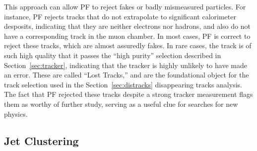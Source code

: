   This approach can allow PF to reject fakes or badly mismeasured particles.
  For instance, PF rejects tracks that do not extrapolate to significant calorimeter desposits, indicating that they are neither electrons nor hadrons, and also do not have a corresponding track in the muon chamber.
  In most cases, PF is correct to reject these tracks, which are almost assuredly fakes.
  In rare cases, the track is of such high quality that it passes the ``high purity'' selection described in Section~\ref{sec:tracker}, indicating that the tracker is highly unlikely to have made an error.
  These are called ``Lost Tracks,'' and are the foundational object for the track selection used in the Section~\ref{sec:distracks} disappearing tracks analysis.
  The fact that PF rejected these tracks despite a strong tracker measurement flags them as worthy of further study, serving as a useful clue for searches for new physics.
  
  \subsection{Jet Clustering} \label{sec:jetclustering}


